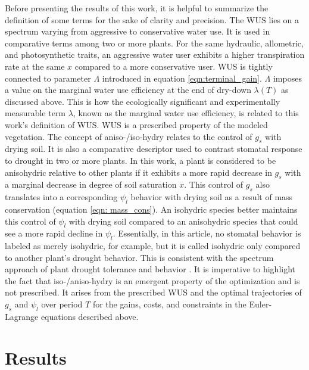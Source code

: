 \documentclass[utf8]{frontiersSCNS} %
\begin{document}
Before presenting the results of this work, it is helpful to summarize the definition of some terms for the sake of clarity and precision. The WUS lies on a spectrum varying from aggressive to conservative water use. It is used in comparative terms among two or more plants. For the same hydraulic, allometric, and photosynthetic traits, an aggressive water user exhibits a higher transpiration rate at the same $x$ compared to a more conservative user. WUS is tightly connected to parameter $\Lambda$ introduced in equation \ref{eqn:terminal_gain}. $\Lambda$ imposes a value on the marginal water use efficiency at the end of dry-down $\lambda(T)$ as discussed above. This is how the ecologically significant and experimentally measurable term $\lambda$, known as the marginal water use efficiency, is related to this work's definition of WUS. WUS is a prescribed property of the modeled vegetation. The concept of aniso-/iso-hydry relates to the control of $g_s$ with drying soil. It is also a comparative descriptor used to contrast stomatal response to drought in two or more plants. In this work, a plant is considered to be anisohydric relative to other plants if it exhibits a more rapid decrease in $g_s$ with a marginal decrease in degree of soil saturation $x$. This control of $g_s$ also translates into a corresponding $\psi_l$ behavior with drying soil as a result of mass conservation (equation \ref{eqn: mass_cons}). An isohydric species better maintains this control of $\psi_l$ with drying soil compared to an anisohydric species that could see a more rapid decline in $\psi_l$. Essentially, in this article, no stomatal behavior is labeled as merely isohydric, for example, but it is called isohydric only compared to another plant's drought behavior. This is consistent with the spectrum approach of plant drought tolerance and behavior \citep{martinezvilalta_new_2014, garciaforner_responses_2016}. It is imperative to highlight the fact that iso-/aniso-hydry is an emergent property of the optimization and is not prescribed.  It arises from the prescribed WUS and the optimal trajectories of $g_s$ and $\psi_l$ over period $T$ for the gains, costs, and constraints in the Euler-Lagrange equations described above.

\section{Results}
\end{document}
